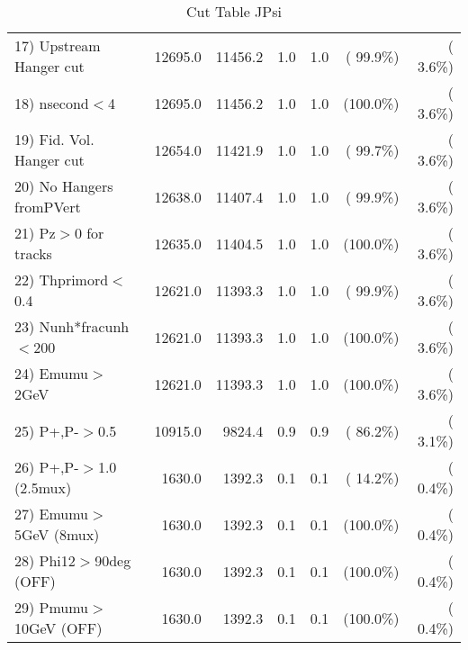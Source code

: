 \begin{table}[h!]
\begin{tabular}{||l||r|r|r|r|r|r||}
 17) Upstream Hanger cut  &      12695.0 &      11456.2 &          1.0 &          1.0 & ( 99.9\%) & (  3.6\%) \\
 18) nsecond$<$4          &      12695.0 &      11456.2 &          1.0 &          1.0 & (100.0\%) & (  3.6\%) \\
 19) Fid. Vol. Hanger cut &      12654.0 &      11421.9 &          1.0 &          1.0 & ( 99.7\%) & (  3.6\%) \\
 20) No Hangers fromPVert &      12638.0 &      11407.4 &          1.0 &          1.0 & ( 99.9\%) & (  3.6\%) \\
 21) Pz$>$0 for tracks    &      12635.0 &      11404.5 &          1.0 &          1.0 & (100.0\%) & (  3.6\%) \\
 22) Thprimord$<$0.4      &      12621.0 &      11393.3 &          1.0 &          1.0 & ( 99.9\%) & (  3.6\%) \\
 23) Nunh*fracunh$<$200   &      12621.0 &      11393.3 &          1.0 &          1.0 & (100.0\%) & (  3.6\%) \\
 24) Emumu$>$2GeV         &      12621.0 &      11393.3 &          1.0 &          1.0 & (100.0\%) & (  3.6\%) \\
 25) P+,P-$>$0.5          &      10915.0 &       9824.4 &          0.9 &          0.9 & ( 86.2\%) & (  3.1\%) \\
 26) P+,P-$>$1.0 (2.5mux) &       1630.0 &       1392.3 &          0.1 &          0.1 & ( 14.2\%) & (  0.4\%) \\
 27) Emumu$>$5GeV  (8mux) &       1630.0 &       1392.3 &          0.1 &          0.1 & (100.0\%) & (  0.4\%) \\
 28) Phi12$>$90deg  (OFF) &       1630.0 &       1392.3 &          0.1 &          0.1 & (100.0\%) & (  0.4\%) \\
 29) Pmumu$>$10GeV  (OFF) &       1630.0 &       1392.3 &          0.1 &          0.1 & (100.0\%) & (  0.4\%) \\
 \hline
 \hline
 \end{tabular}
 \caption{Cut Table  JPsi     }
 \label{tab-cutcohjpsi-mumu_jpsi}
 \end{table}

